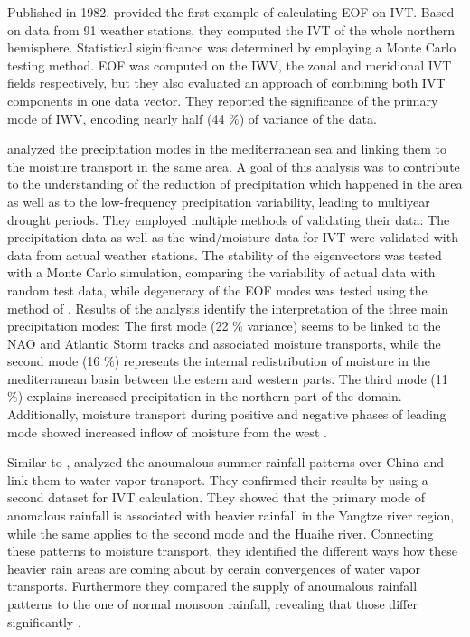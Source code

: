 Published in 1982, \citeauthor{salstein_modes_1983} provided the first example of calculating EOF on IVT. 
Based on data from 91 weather stations, they computed the IVT of the whole northern hemisphere. 
Statistical siginificance was determined by employing a Monte Carlo testing method. 
EOF was computed on the IWV, the zonal and meridional IVT fields respectively, but they also evaluated an approach of combining both IVT components in one data vector. 
They reported the significance of the primary mode of IWV, encoding nearly half (44 \%) of variance of the data. 


\citeauthor{fernandez_analysis_2003} analyzed the precipitation modes in the mediterranean sea and linking them to the moisture transport in the same area. 
A goal of this analysis was to contribute to the understanding of the reduction of precipitation which happened in the area as well as to the low-frequency precipitation variability, leading to multiyear drought periods.
They employed multiple methods of validating their data: The precipitation data as well as the wind/moisture data for IVT were validated with data from actual weather stations. 
The stability of the eigenvectors was tested with a Monte Carlo simulation, comparing the variability of actual data with random test data, while degeneracy of the EOF modes was tested using the method of \citeauthor{north_sampling_1982} \cite{north_sampling_1982}. 
Results of the analysis identify the interpretation of the three main precipitation modes:
The first mode (22 \% variance) seems to be linked to the NAO and Atlantic Storm tracks and associated moisture transports, while the second mode (16 \%) represents the internal redistribution of moisture in the mediterranean basin between the estern and western parts.  
The third mode (11 \%) explains increased precipitation in the northern part of the domain. 
Additionally, moisture transport during positive and negative phases of leading mode showed increased inflow of moisture from the west \cite{fernandez_analysis_2003}. 



Similar to \cite{fernandez_analysis_2003}, \citeauthor{zhou_atmospheric_2005} analyzed the anoumalous summer rainfall patterns over China and link them to water vapor transport. 
They confirmed their results by using a second dataset for IVT calculation. 
They showed that the primary mode of anomalous rainfall is associated with heavier rainfall in the Yangtze river region, while the same applies to the second mode and the Huaihe river. 
Connecting these patterns to moisture transport, they identified the different ways how these heavier rain areas are coming about by cerain convergences of water vapor transports. 
Furthermore they compared the supply of anoumalous rainfall patterns to the one of normal monsoon rainfall, revealing that those differ significantly \cite{zhou_atmospheric_2005}.


